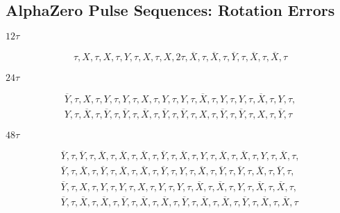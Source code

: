 \subsection{AlphaZero Pulse Sequences: Rotation Errors}

\noindent $12\tau$

\begin{equation*}
\begin{aligned}
    \tau, X, \tau, X, \tau, Y, \tau, X, \tau, X, 2\tau, \overline{X}, \tau, \overline{X}, \tau, \overline{Y}, \tau, \overline{X}, \tau, \overline{X}, \tau
\end{aligned}
\end{equation*}

\noindent $24\tau$

\begin{equation*}
\begin{aligned}
    \overline{Y}, \tau, X, \tau, Y, \tau, Y, \tau, X, \tau, Y, \tau, Y, \tau, \overline{X}, \tau, Y, \tau, Y, \tau, \overline{X}, \tau, Y, \tau, \\
    Y, \tau, \overline{X}, \tau, \overline{Y}, \tau, \overline{Y}, \tau, \overline{X}, \tau, \overline{Y}, \tau, \overline{Y}, \tau, X, \tau, \overline{Y}, \tau, \overline{Y}, \tau, X, \tau, \overline{Y}, \tau
\end{aligned}
\end{equation*}

\noindent $48\tau$

\begin{equation*}
\begin{aligned}
    \overline{Y}, \tau, \overline{Y}, \tau, \overline{X}, \tau, \overline{X}, \tau, \overline{X}, \tau, \overline{Y}, \tau, \overline{X}, \tau, Y, \tau, \overline{X}, \tau, \overline{X}, \tau, Y, \tau, \overline{X}, \tau, \\
    \overline{Y}, \tau, \overline{X}, \tau, \overline{Y}, \tau, \overline{X}, \tau, \overline{X}, \tau, \overline{Y}, \tau, Y, \tau, \overline{X}, \tau,
    \overline{Y}, \tau, \overline{Y}, \tau, \overline{X}, \tau, \overline{Y}, \tau, \\
    \overline{Y}, \tau, X, \tau, Y, \tau, Y, \tau, X, \tau, Y, \tau, Y, \tau, \overline{X}, \tau, \overline{X}, \tau, Y, \tau, \overline{X}, \tau, \overline{X}, \tau, \\
    \overline{Y}, \tau, \overline{X}, \tau, \overline{X}, \tau, \overline{Y}, \tau, \overline{X}, \tau, \overline{X}, \tau, \overline{Y}, \tau,
    \overline{X}, \tau, \overline{X}, \tau, \overline{Y}, \tau, \overline{X}, \tau, \overline{X}, \tau
\end{aligned}
\end{equation*}



